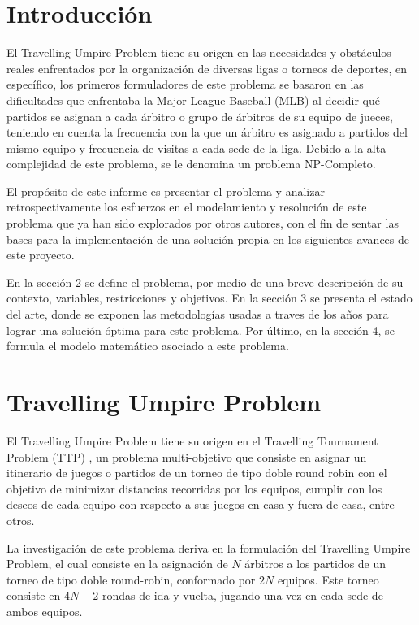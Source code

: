 \documentclass[letter, 10pt]{article}
\begin{document}
\section{Introducci\'on}

El Travelling Umpire Problem tiene su origen en las necesidades y obst\'aculos reales enfrentados por la organizaci\'on de diversas ligas o torneos de deportes, en espec\'ifico, los primeros formuladores de este problema se basaron en las dificultades que enfrentaba la Major League Baseball (MLB) al decidir qu\'e partidos se asignan a cada \'arbitro o grupo de \'arbitros de su equipo de jueces, teniendo en cuenta la frecuencia con la que un \'arbitro es asignado a partidos del mismo equipo y frecuencia de visitas a cada sede de la liga. \cite{trick_2007}
Debido a la alta complejidad de este problema, se le denomina un problema NP-Completo.

El prop\'osito de este informe es presentar el problema y analizar retrospectivamente los esfuerzos en el modelamiento y resoluci\'on de este problema que ya han sido explorados por otros autores, con el fin de sentar las bases para la implementaci\'on de una soluci\'on propia en los siguientes avances de este proyecto.

En la secci\'on 2 se define el problema, por medio de una breve descripci\'on de su contexto, variables, restricciones y objetivos.
En la secci\'on 3 se presenta el estado del arte, donde se exponen las metodolog\'ias usadas a traves de los a\~nos para lograr una soluci\'on \'optima para este problema.
Por \'ultimo, en la secci\'on 4, se formula el modelo matem\'atico asociado a este problema.

\section{Travelling Umpire Problem}

El Travelling Umpire Problem tiene su origen en el Travelling Tournament Problem (TTP) \cite{trick_2007} \cite{ttp_2001}, un problema multi-objetivo que consiste en asignar un itinerario de juegos o partidos de un torneo de tipo doble round robin con el objetivo de minimizar distancias recorridas por los equipos, cumplir con los deseos de cada equipo con respecto a sus juegos en casa y fuera de casa, entre otros. \cite{ttp_2001}

La investigaci\'on de este problema deriva en la formulaci\'on del Travelling Umpire Problem, el cual consiste en la asignaci\'on de $N$ \'arbitros a los partidos de un torneo de tipo doble round-robin, conformado por $2N$ equipos. Este torneo consiste en $4N-2$ rondas de ida y vuelta, jugando una vez en cada sede de ambos equipos. \cite{trick_2007}
\end{document}
